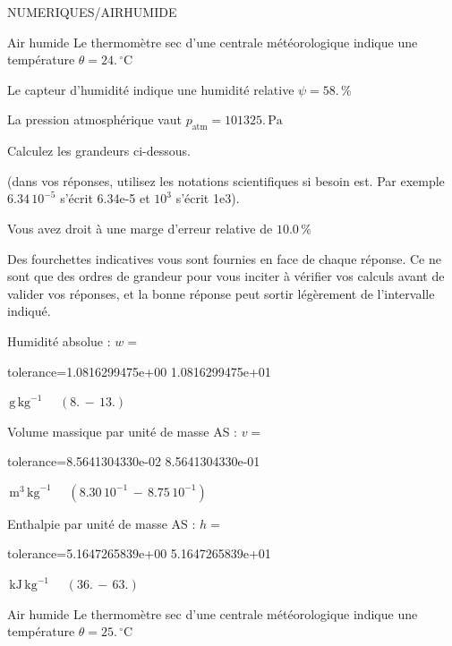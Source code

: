 \documentclass[12pt]{article}
\begin{document}
\begin{quiz}{NUMERIQUES/AIRHUMIDE} 

 \begin{cloze}{Air humide} 
Le thermomètre sec d’une centrale météorologique indique une température $\theta = 24.\,  \mathrm{^\circ\mathrm{C}} $

Le capteur d'humidité indique une humidité relative $\psi = 58.\, \% $

La pression atmosphérique vaut $p_{\text{atm}} = 101325.\,  \mathrm{Pa} $

 

Calculez les grandeurs ci-dessous.

(dans vos réponses, utilisez les notations scientifiques si besoin est. Par exemple $6.34\, 10^{-5}$ s'écrit 6.34e-5 et $10^{3}$ s'écrit 1e3).

Vous avez droit à une marge d'erreur relative de $10.0\, \% $

Des fourchettes indicatives vous sont fournies en face de chaque réponse. Ce ne sont que des ordres de grandeur pour vous inciter à vérifier vos calculs avant de valider vos réponses, et la bonne réponse peut sortir légèrement de l'intervalle indiqué.

Humidité absolue : $w =  $
\begin{numerical}[points=1] 
\item[tolerance={1.0816299475e+00}] 1.0816299475e+01 
\end{numerical} 
 $\,  \mathrm{g}\,  \mathrm{kg}^{-1}$ 
 $ \quad (8. \, - \, 13.) $ 

Volume massique par unité de masse AS : $v =  $
\begin{numerical}[points=1] 
\item[tolerance={8.5641304330e-02}] 8.5641304330e-01 
\end{numerical} 
 $\,  \mathrm{m}^{3}\,  \mathrm{kg}^{-1}$ 
 $ \quad ( 8.30 \, 10^{-1}  \, - \,  8.75 \, 10^{-1} ) $ 

Enthalpie par unité de masse AS : $h =  $
\begin{numerical}[points=2] 
\item[tolerance={5.1647265839e+00}] 5.1647265839e+01 
\end{numerical} 
 $\,  \mathrm{kJ}\,  \mathrm{kg}^{-1}$ 
 $ \quad (36. \, - \, 63.) $ 

\end{cloze} 


 \begin{cloze}{Air humide} 
Le thermomètre sec d’une centrale météorologique indique une température $\theta = 25.\,  \mathrm{^\circ\mathrm{C}} $


\end{cloze}
\end{quiz}
\end{document}
